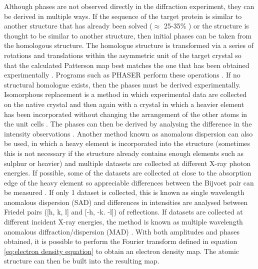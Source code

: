         Although phases are not observed directly in the diffraction experiment, they can be derived in multiple ways.
        If the sequence of the target protein is similar to another structure that has already been solved ($\approx$ 25-35\% \cite{taylor2010,abergel2013molecular}) or the structure is thought to be similar to another structure, then initial phases can be taken from the homologous structure.
        The homologue structure is transformed via a series of rotations and translations within the asymmetric unit of the target crystal so that the calculated Patterson map best matches the one that has been obtained experimentally \cite{mccoy2007solving}.
        Programs such as PHASER perform these operations \cite{mccoy2007phaser}.
        \newline
        If no structural homologue exists, then the phases must be derived experimentally.
        Isomorphous replacement is a method in which experimental data are collected on the native crystal and then again with a crystal in which a heavier element has been incorporated without changing the arrangement of the other atoms in the unit cells \cite{perutz1956isomorphous}.
        The phases can then be derived by analysing the difference in the intensity observations \cite{taylor2010}.
        \newline
        Another method known as anomalous dispersion can also be used, in which a heavy element is incorporated into the structure (sometimes this is not necessary if the structure already contains enough elements such as sulphur or heavier) and multiple datasets are collected at different X-ray photon energies.
        If possible, some of the datasets are collected at close to the absorption edge of the heavy element so appreciable differences between the Bijvoet pair can be measured \cite{bijvoet1954structure}.
        If only 1 dataset is collected, this is known as single wavelength anomalous dispersion (SAD) and differences in intensities are analysed between Friedel pairs ([h, k, l] and [-h, -k. -l]) of reflections.
        If datasets are collected at different incident X-ray energies, the method is known as multiple wavelength anomalous diffraction/dispersion (MAD) \cite{hendrickson1991determination,taylor2010}.
        \newline
        With both amplitudes and phases obtained, it is possible to perform the Fourier transform defined in equation \ref{eq:electron density equation} to obtain an electron density map.
        The atomic structure can then be built into the resulting map.
